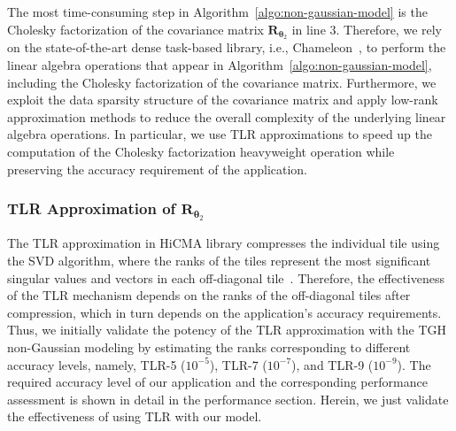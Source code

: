 \documentclass[conference]{IEEEtran}
\begin{document}
The most time-consuming step in Algorithm~\ref{algo:non-gaussian-model} is the Cholesky 
factorization of the covariance matrix $\bm{R}_{\bm{\theta}_2}$ in line 3. 
 Therefore, we rely on the state-of-the-art
dense task-based library, i.e., Chameleon~\cite{chameleon-soft}, to perform the
linear algebra operations that appear in Algorithm~\ref{algo:non-gaussian-model}, including the Cholesky factorization of the
covariance matrix. Furthermore,  we exploit the data sparsity
structure of the covariance matrix and apply low-rank
approximation methods to reduce the overall 
complexity of the underlying linear algebra operations. 
In particular, we use TLR  approximations to speed up the computation of the Cholesky factorization 
heavyweight operation while preserving the accuracy 
requirement of the application. 





\subsubsection*{TLR Approximation of $\bm{R}_{\bm{\theta}_2}$}
The TLR approximation in HiCMA library compresses
the individual tile using
the SVD algorithm, where the ranks of the tiles represent
the most significant singular values and vectors in each off-diagonal tile~\cite{akbudak2017tile}. Therefore, the effectiveness of the TLR
mechanism depends on the ranks of the off-diagonal tiles
after compression, which in turn depends on the application's
accuracy requirements. Thus, we initially validate the potency 
of the TLR approximation with the TGH non-Gaussian modeling
by estimating the ranks corresponding to different accuracy levels, namely, TLR-5 ($10^{-5}$), TLR-7 ($10^{-7}$), and TLR-9 ($10^{-9}$). 
The required accuracy level of our application and the corresponding performance assessment is shown in detail in the performance
section. Herein, we just validate the effectiveness of using TLR
with our model.
\end{document}
